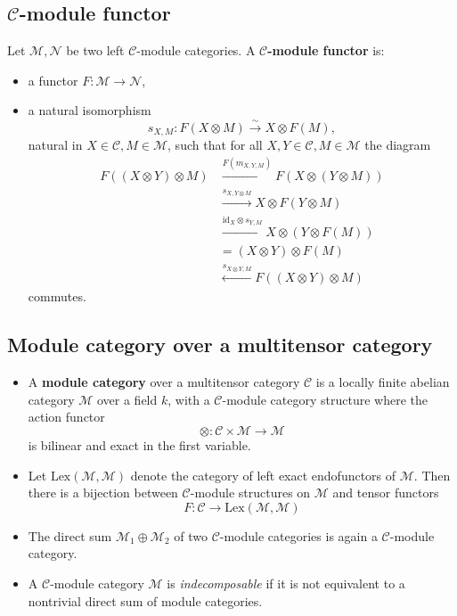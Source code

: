 \documentclass[11pt]{article}
\theoremstyle{definition}
\begin{document}
\subsection{ \( \mathcal{C} \)-module functor}
Let \( \mathcal{M}, \mathcal{N} \) be two left \( \mathcal{C} \)-module categories. A \textbf{\( \mathcal{C} \)-module functor} is:
\begin{itemize}
  \item a functor \( F : \mathcal{M} \to \mathcal{N} \),
  \item a natural isomorphism
  \[
  s_{X,M} : F(X \otimes M) \xrightarrow{\sim} X \otimes F(M),
  \]
  natural in \( X \in \mathcal{C}, M \in \mathcal{M} \), such that for all \( X,Y \in \mathcal{C}, M \in \mathcal{M} \) the diagram
  \[
  \begin{aligned}
  F((X \otimes Y) \otimes M) &\xrightarrow{F(m_{X,Y,M})} F(X \otimes (Y \otimes M)) \\
  &\xrightarrow{s_{X,Y \otimes M}} X \otimes F(Y \otimes M) \\
  &\xrightarrow{\mathrm{id}_X \otimes s_{Y,M}} X \otimes (Y \otimes F(M)) \\
  &= (X \otimes Y) \otimes F(M) \\
  &\xleftarrow{s_{X \otimes Y, M}} F((X \otimes Y) \otimes M)
  \end{aligned}
  \]
  commutes.
\end{itemize}

\subsection{ Module category over a multitensor category}
\begin{itemize}
  \item A \textbf{module category} over a multitensor category \( \mathcal{C} \) is a locally finite abelian category \( \mathcal{M} \) over a field \( k \), with a \( \mathcal{C} \)-module category structure where the action functor
  \[ \otimes : \mathcal{C} \times \mathcal{M} \to \mathcal{M} \]
  is bilinear and exact in the first variable.

  \item Let \( \mathrm{Lex}(\mathcal{M},\mathcal{M}) \) denote the category of left exact endofunctors of \( \mathcal{M} \). Then there is a bijection between \( \mathcal{C} \)-module structures on \( \mathcal{M} \) and tensor functors
  \[ F : \mathcal{C} \to \mathrm{Lex}(\mathcal{M}, \mathcal{M}) \]

  \item The direct sum \( \mathcal{M}_1 \oplus \mathcal{M}_2 \) of two \( \mathcal{C} \)-module categories is again a \( \mathcal{C} \)-module category.

  \item A \( \mathcal{C} \)-module category \( \mathcal{M} \) is \emph{indecomposable} if it is not equivalent to a nontrivial direct sum of module categories.
\end{itemize}
\end{document}
